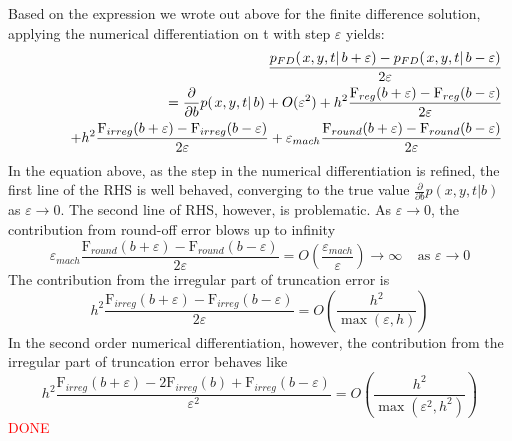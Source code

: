 \documentclass[12pt]{article}
\begin{document}
\begin{itemize}
Based on the expression we wrote out above for the finite difference solution, 
applying the numerical differentiation on t with step $\varepsilon$ yields: 
\begin{eqnarray}
& & \frac{p_{FD}(\left. x, y, t \right| b+\varepsilon)-p_{FD}(\left. x, y, t \right| b -\varepsilon)}{2 \varepsilon} \nonumber \\
& & \hspace*{1cm} =  \frac{\partial }{\partial b} p(\left. x, y, t \right| b) + O(\varepsilon^2)
 + h^2 \frac{\mbox{F}_{reg}(b+\varepsilon)-\mbox{F}_{reg}(b-\varepsilon)}{2 \varepsilon}  \nonumber \\
& & \hspace*{1cm} + h^2 \frac{\mbox{F}_{irreg}(b+\varepsilon)-\mbox{F}_{irreg}(b-\varepsilon)}{2 \varepsilon}
 + \varepsilon_{mach} \frac{\mbox{F}_{round}(b+\varepsilon)-\mbox{F}_{round}(b-\varepsilon)}{2 \varepsilon}  \nonumber
\end{eqnarray}
In the equation above, as the step in the numerical differentiation is refined, the first line 
of the RHS is well behaved, converging to the true value 
$\frac{\partial }{\partial b} p(\left. x, y, t \right| b)$ as $\varepsilon \rightarrow 0$. 
The second line of RHS, however, is problematic. As $\varepsilon \rightarrow 0$, 
the contribution from round-off error blows up to infinity
$$ \varepsilon_{mach} \frac{\mbox{F}_{round}(b+\varepsilon)-\mbox{F}_{round}(b-\varepsilon)}{2 \varepsilon}  = O\left(\frac{\varepsilon_{mach}}{\varepsilon} \right) 
\longrightarrow \infty \;\;\;\; \mbox{as } \varepsilon \rightarrow 0 $$
The contribution from the irregular part of truncation error is 
$$ h^2 \frac{\mbox{F}_{irreg}(b+\varepsilon)-\mbox{F}_{irreg}(b-\varepsilon)}{2 \varepsilon}  = 
O\left(\frac{h^2}{\max(\varepsilon, h)} \right) $$ 
In the second order numerical differentiation, however, the contribution from 
the irregular part of truncation error behaves like 
$$ h^2 \frac{\mbox{F}_{irreg}(b+\varepsilon)-2\mbox{F}_{irreg}(b)
+\mbox{F}_{irreg}(b-\varepsilon)}{\varepsilon^2 }  = 
O\left(\frac{h^2}{\max(\varepsilon^2, h^2)} \right) $$
    \textcolor{red}{DONE}

\end{itemize}
\end{document}
